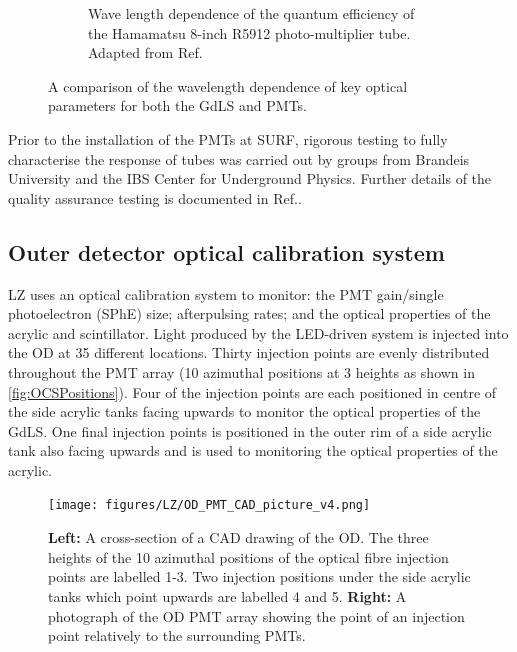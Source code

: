 \begin{figure}[h!]
\begin{subfigure}{0.47\textwidth}
         \caption{Wave length dependence of the quantum efficiency of the Hamamatsu 8-inch R5912 photo-multiplier tube. Adapted from Ref.\cite{HamamatsuR5912}}
         \label{fig:ODPMTQE}
     \end{subfigure}
     \caption{A comparison of the wavelength dependence of key optical parameters for both the GdLS and PMTs.}
     \label{fig:ODPMTSpecRes}
\end{figure}
Prior to the installation of the PMTs at SURF, rigorous testing to fully characterise the response of tubes was carried out by groups from Brandeis University and the IBS Center for Underground Physics. Further details of the quality assurance testing is documented in Ref.\cite{lkorley:thesis}.

\subsection{Outer detector optical calibration system}\label{sec:LZ/ODOCS}
LZ uses an optical calibration system to monitor: the PMT gain/single photoelectron (SPhE) size; afterpulsing rates; and the optical properties of the acrylic and scintillator. Light produced by the LED-driven system is injected into the OD at 35 different locations. Thirty injection points are evenly distributed throughout the PMT array  (10 azimuthal positions at 3 heights as shown in \autoref{fig:OCSPositions}). Four of the injection points are each positioned in centre of the side acrylic tanks facing upwards to monitor the optical properties of the GdLS. One final injection points is positioned in the outer rim of a side acrylic tank also facing upwards and is used to monitoring the optical properties of the acrylic.
\begin{figure}[h!]
    \centering
    \texttt{[image: figures/LZ/OD\_PMT\_CAD\_picture\_v4.png]}
    \caption{\textbf{Left:} A cross-section of a CAD drawing of the OD. The three  heights of the 10 azimuthal positions of the optical fibre injection points are labelled 1-3. Two injection positions under the side acrylic tanks which point upwards are labelled 4 and 5. \textbf{Right:} A photograph of the OD PMT array showing the point of an injection point relatively to the surrounding PMTs.}
    \label{fig:OCSPositions}
\end{figure}
